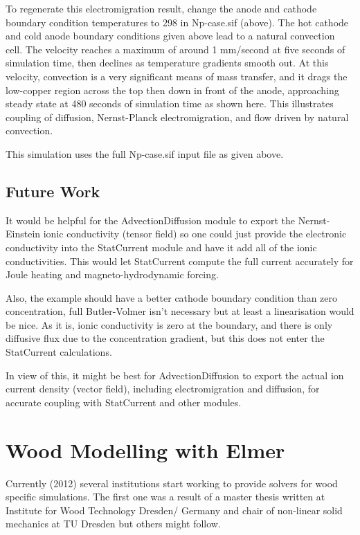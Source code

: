 To regenerate this electromigration result, change the anode and cathode boundary condition temperatures to 298 in Np-case.sif (above).  The hot cathode and cold anode boundary conditions given above lead to a natural convection cell. The velocity reaches a maximum of around 1 mm/second at five seconds of simulation time, then declines as temperature gradients smooth out. At this velocity, convection is a very significant means of mass transfer, and it drags the low-copper region across the top then down in front of the anode, approaching steady state at 480 seconds of simulation time as shown here. This illustrates coupling of diffusion, Nernst-Planck electromigration, and flow driven by natural convection.

This simulation uses the full Np-case.sif input file as given above.

\subsection{Future Work}

It would be helpful for the AdvectionDiffusion module to export the Nernst-Einstein ionic conductivity (tensor field) so one could just provide the electronic conductivity into the StatCurrent module and have it add all of the ionic conductivities. This would let StatCurrent compute the full current accurately for Joule heating and magneto-hydrodynamic forcing.

Also, the example should have a better cathode boundary condition than zero concentration, full Butler-Volmer isn't necessary but at least a linearisation would be nice. As it is, ionic conductivity is zero at the boundary, and there is only diffusive flux due to the concentration gradient, but this does not enter the StatCurrent calculations.

In view of this, it might be best for AdvectionDiffusion to export the actual ion current density (vector field), including electromigration and diffusion, for accurate coupling with StatCurrent and other modules. 

\section{Wood Modelling with Elmer}

Currently (2012) several institutions start working to provide solvers for wood specific simulations. The first one was a result of a master thesis written at Institute for Wood Technology Dresden/ Germany and chair of non-linear solid mechanics at TU Dresden but others might follow.

